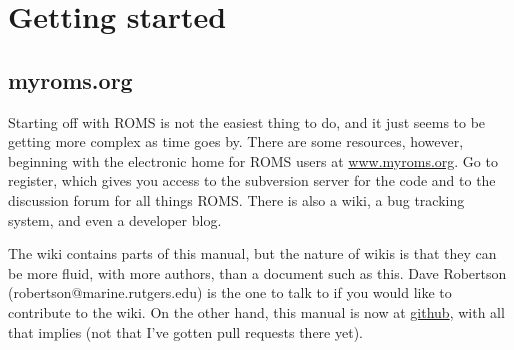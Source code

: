 \section{Getting started}
\label{Starting}

\subsection{myroms.org}
\label{Myroms}
Starting off with ROMS is not the easiest thing to do, and it just
seems to be getting more complex as time goes by. There are
some resources, however, beginning with the
electronic home for ROMS users at
\href{http://www.myroms.org}{www.myroms.org}. Go to register,
which gives you access to the subversion server for the code and to
the  discussion forum for all things ROMS. There is also a wiki,
a bug tracking system, and even a developer blog.

The wiki contains parts of this manual, but the nature of wikis is that
they can be more fluid, with more authors, than a document such as
this. Dave Robertson (robertson@marine.rutgers.edu) is the one to
talk to if you would like to contribute to the wiki. On the other
hand, this manual is now at
\href{https://github.com/kshedstrom/roms_manual}{github}, with all that
implies (not that I've gotten pull requests there yet).

